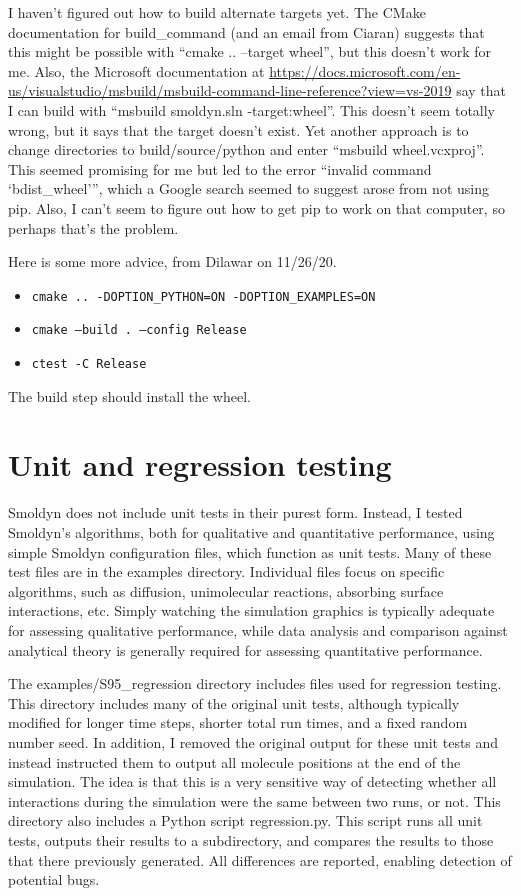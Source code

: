 \documentclass {scrbook}
\newcommand {\ttt} {\texttt}
\begin{document}
I haven't figured out how to build alternate targets yet. The CMake documentation for build\_command (and an email from Ciaran) suggests that this might be possible with ``cmake .. --target wheel'', but this doesn't work for me. Also, the Microsoft documentation at \url{https://docs.microsoft.com/en-us/visualstudio/msbuild/msbuild-command-line-reference?view=vs-2019} say that I can build with ``msbuild smoldyn.sln -target:wheel''. This doesn't seem totally wrong, but it says that the target doesn't exist. Yet another approach is to change directories to build/source/python and enter ``msbuild wheel.vcxproj''. This seemed promising for me but led to the error ``invalid command `bdist\_wheel''', which a Google search seemed to suggest arose from not using pip. Also, I can't seem to figure out how to get pip to work on that computer, so perhaps that's the problem.

Here is some more advice, from Dilawar on 11/26/20.
\begin{itemize}
\item \ttt{cmake .. -DOPTION\_PYTHON=ON -DOPTION\_EXAMPLES=ON}
\item \ttt{cmake --build . --config Release}
\item \ttt{ctest -C Release}
\end{itemize}
The build step should install the wheel.

\section{Unit and regression testing}

Smoldyn does not include unit tests in their purest form. Instead, I tested Smoldyn's algorithms, both for qualitative and quantitative performance, using simple Smoldyn configuration files, which function as unit tests. Many of these test files are in the examples directory. Individual files focus on specific algorithms, such as diffusion, unimolecular reactions, absorbing surface interactions, etc. Simply watching the simulation graphics is typically adequate for assessing qualitative performance, while data analysis and comparison against analytical theory is generally required for assessing quantitative performance.

The examples/S95\_regression directory includes files used for regression testing. This directory includes many of the original unit tests, although typically modified for longer time steps, shorter total run times, and a fixed random number seed. In addition, I removed the original output for these unit tests and instead instructed them to output all molecule positions at the end of the simulation. The idea is that this is a very sensitive way of detecting whether all interactions during the simulation were the same between two runs, or not. This directory also includes a Python script regression.py. This script runs all unit tests, outputs their results to a subdirectory, and compares the results to those that there previously generated. All differences are reported, enabling detection of potential bugs.
\end{document}
